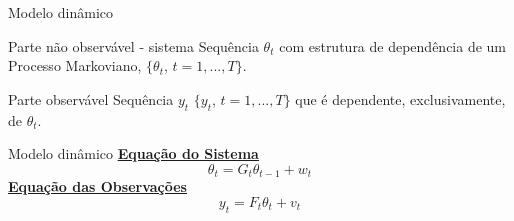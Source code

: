 \documentclass{beamer}
\begin{document}
\begin{frame}{Modelo dinâmico}
\noindent

 
  \begin{block}{Parte não observável - sistema}
  {\large Sequência $\theta_t$ com estrutura de dependência de um Processo Markoviano, $\{\theta_t$, $t=1,...,T\}$.}
\end{block}

\pause
  \begin{block}{Parte observável}
  {\large Sequência $y_t$ $\{y_t$, $t=1,...,T\}$ que é dependente, exclusivamente, de $\theta_t$.}
\end{block}
  

\end{frame}


\begin{frame}{Modelo dinâmico}
\pause
\underline{\textbf{Equação do Sistema}}
$$
\theta_t =  G_t \theta_{t-1} + w_t
$$
\pause
\underline{\textbf{Equação das Observações}}
$$
y_t  =  F_t \theta_{t} + v_t
$$

\end{frame}
\end{document}
